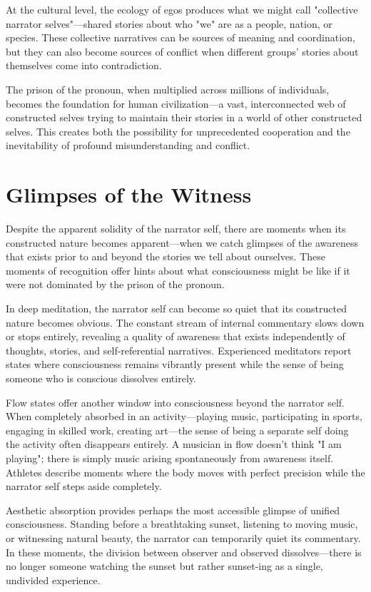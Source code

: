 At the cultural level, the ecology of egos produces what we might call "collective narrator selves"—shared stories about who "we" are as a people, nation, or species. These collective narratives can be sources of meaning and coordination, but they can also become sources of conflict when different groups' stories about themselves come into contradiction.

The prison of the pronoun, when multiplied across millions of individuals, becomes the foundation for human civilization—a vast, interconnected web of constructed selves trying to maintain their stories in a world of other constructed selves. This creates both the possibility for unprecedented cooperation and the inevitability of profound misunderstanding and conflict.

\section{Glimpses of the Witness}

Despite the apparent solidity of the narrator self, there are moments when its constructed nature becomes apparent—when we catch glimpses of the awareness that exists prior to and beyond the stories we tell about ourselves. These moments of recognition offer hints about what consciousness might be like if it were not dominated by the prison of the pronoun.

In deep meditation, the narrator self can become so quiet that its constructed nature becomes obvious. The constant stream of internal commentary slows down or stops entirely, revealing a quality of awareness that exists independently of thoughts, stories, and self-referential narratives. Experienced meditators report states where consciousness remains vibrantly present while the sense of being someone who is conscious dissolves entirely.

Flow states offer another window into consciousness beyond the narrator self. When completely absorbed in an activity—playing music, participating in sports, engaging in skilled work, creating art—the sense of being a separate self doing the activity often disappears entirely. A musician in flow doesn't think "I am playing"; there is simply music arising spontaneously from awareness itself. Athletes describe moments where the body moves with perfect precision while the narrator self steps aside completely.

Aesthetic absorption provides perhaps the most accessible glimpse of unified consciousness. Standing before a breathtaking sunset, listening to moving music, or witnessing natural beauty, the narrator can temporarily quiet its commentary. In these moments, the division between observer and observed dissolves—there is no longer someone watching the sunset but rather sunset-ing as a single, undivided experience.

